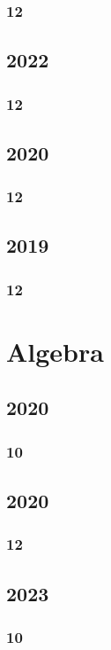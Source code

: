 \documentclass[11pt]{book}
\begin{document}
\subsection{12}

\section{2022}
\subsection{12}

\section{2020}
\subsection{12}

\section{2019}
\subsection{12}





\chapter{Algebra}
\section{2020}
\subsection{10}

\section{2020}
\subsection{12}

\section{2023}
\subsection{10}

\end{document}
